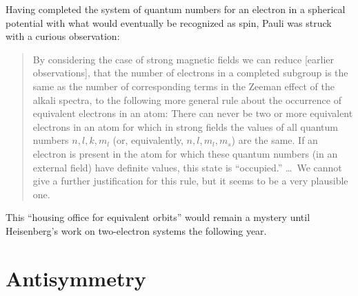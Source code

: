 Having completed the system of quantum numbers for an electron in a spherical
potential with what would eventually be recognized as spin, Pauli was struck
with a curious observation:
\begin{quote}
    By considering the case of strong magnetic fields we can reduce [earlier
    observations], that the number of electrons in a completed subgroup is the
    same as the number of corresponding terms in the Zeeman effect of the alkali
    spectra, to the following more general rule about the occurrence of
    equivalent electrons in an atom:
    There can never be two or more equivalent electrons in an atom for which
    in strong fields the values of all quantum numbers \(n, l, k, m_l\) (or,
    equivalently, \(n, l, m_l, m_s\)) are the same.
    If an electron is present in the atom for which these quantum numbers
    (in an external field) have definite values, this state is ``occupied.''
    \dots\
    We cannot give a further justification for this rule, but it seems to be a
    very plausible one.\cite{Pauli:1925p756}
\end{quote}
This ``housing office for equivalent orbits''\cite{Mehra:1982} would remain a
mystery until Heisenberg's work on two-electron systems the following year.


\section{Antisymmetry}

